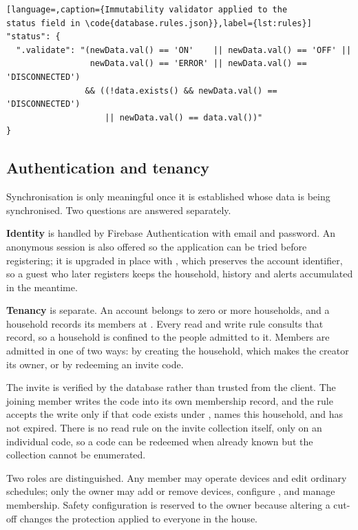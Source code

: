 \documentclass[11pt,a4paper]{article}
\begin{document}
\begin{lstlisting}[language=,caption={Immutability validator applied to the
status field in \code{database.rules.json}},label={lst:rules}]
"status": {
  ".validate": "(newData.val() == 'ON'    || newData.val() == 'OFF' ||
                 newData.val() == 'ERROR' || newData.val() == 'DISCONNECTED')
                && ((!data.exists() && newData.val() == 'DISCONNECTED')
                    || newData.val() == data.val())"
}
\end{lstlisting}


\subsection{Authentication and tenancy}

Synchronisation is only meaningful once it is established whose data is being
synchronised. Two questions are answered separately.

\textbf{Identity} is handled by Firebase Authentication with email and password.
An anonymous session is also offered so the application can be tried before
registering; it is upgraded in place with , which
preserves the account identifier, so a guest who later registers keeps the
household, history and alerts accumulated in the meantime.

\textbf{Tenancy} is separate. An account belongs to zero or more households, and
a household records its members at . Every read and
write rule consults that record, so a household is confined to the people
admitted to it. Members are admitted in one of two ways: by creating the
household, which makes the creator its owner, or by redeeming an invite code.

The invite is verified by the database rather than trusted from the client. The
joining member writes the code into its own membership record, and the rule
accepts the write only if that code exists under , names this
household, and has not expired. There is no read rule on the invite collection
itself, only on an individual code, so a code can be redeemed when already known
but the collection cannot be enumerated.

Two roles are distinguished. Any member may operate devices and edit ordinary
schedules; only the owner may add or remove devices, configure
, and manage membership. Safety configuration is
reserved to the owner because altering a cut-off changes the protection applied
to everyone in the house.
\end{document}
